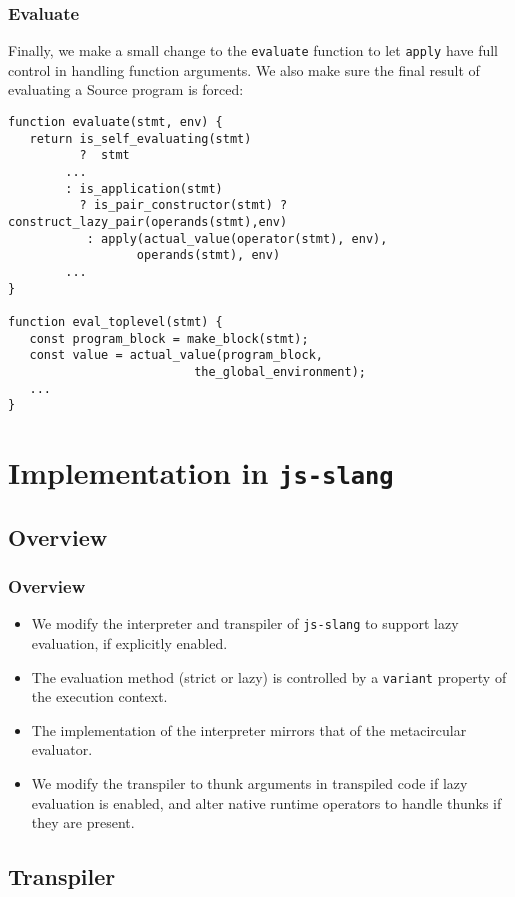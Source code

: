 \documentclass[12pt]{beamer}
\begin{document}
\begin{frame}[fragile]
\frametitle{Evaluate}
Finally, we make a small change to the \texttt{evaluate} function to let \texttt{apply} have full control in handling function arguments. We also make sure the final result of evaluating a Source program is forced:
\begin{lstlisting}
function evaluate(stmt, env) {
   return is_self_evaluating(stmt)
          ?  stmt
        ...
        : is_application(stmt)
          ? is_pair_constructor(stmt) ? construct_lazy_pair(operands(stmt),env) 
           : apply(actual_value(operator(stmt), env),
                  operands(stmt), env)
        ...
}

function eval_toplevel(stmt) {
   const program_block = make_block(stmt);
   const value = actual_value(program_block, 
                          the_global_environment);
   ...
}
\end{lstlisting}
\end{frame}

\section{Implementation in \texttt{js-slang}}

\subsection{Overview}

\begin{frame}
\frametitle{Overview}
\begin{itemize}
\item<1-> We modify the interpreter and transpiler of \texttt{js-slang} to support lazy evaluation, if explicitly enabled.
\item<2-> The evaluation method (strict or lazy) is controlled by a \texttt{variant} property of the execution context.
\item<3-> The implementation of the interpreter mirrors that of the metacircular evaluator.
\item<4-> We modify the transpiler to thunk arguments in transpiled code if lazy evaluation is enabled, and alter native runtime operators to handle thunks if they are present.
\end{itemize}
\end{frame}

\subsection{Transpiler}
\end{document}
